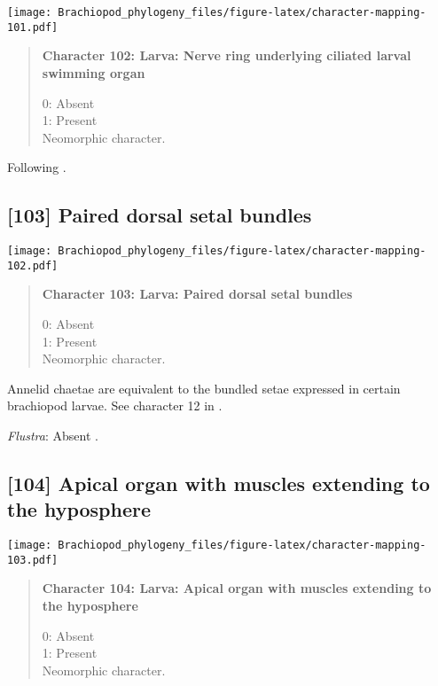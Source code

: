 \documentclass[openany]{book}
\theoremstyle{definition}
\theoremstyle{definition}
\theoremstyle{definition}
\theoremstyle{remark}
\begin{document}
\texttt{[image: Brachiopod\_phylogeny\_files/figure-latex/character-mapping-101.pdf]}

\begin{quote}
\textbf{Character 102: Larva: Nerve ring underlying ciliated larval
swimming organ}

0: Absent\\
1: Present\\
Neomorphic character.
\end{quote}

Following \citet{Wanninger2009}.

\subsection*{{[}103{]} Paired dorsal setal
bundles}\label{paired-dorsal-setal-bundles}

\texttt{[image: Brachiopod\_phylogeny\_files/figure-latex/character-mapping-102.pdf]}

\begin{quote}
\textbf{Character 103: Larva: Paired dorsal setal bundles}

0: Absent\\
1: Present\\
Neomorphic character.
\end{quote}

Annelid chaetae are equivalent to the bundled setae expressed in certain
brachiopod larvae. See character 12 in \citet{Vinther2008}.

\hypertarget{Flustra-coding-103}{}
\emph{Flustra}: Absent \citep{Zimmer2013}.

\subsection*{{[}104{]} Apical organ with muscles extending to the
hyposphere}\label{apical-organ-with-muscles-extending-to-the-hyposphere}

\texttt{[image: Brachiopod\_phylogeny\_files/figure-latex/character-mapping-103.pdf]}

\begin{quote}
\textbf{Character 104: Larva: Apical organ with muscles extending to the
hyposphere}

0: Absent\\
1: Present\\
Neomorphic character.
\end{quote}
\end{document}

